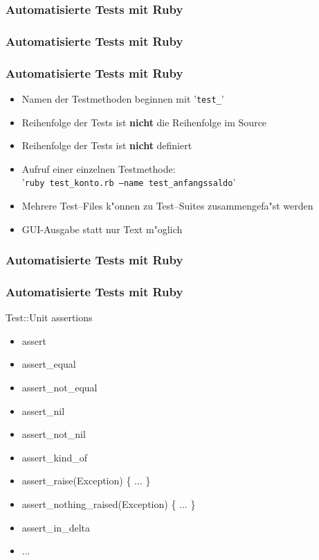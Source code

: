 \documentclass{beamer}
\begin{document}
\begin{frame}[containsverbatim]
  \frametitle{Automatisierte Tests mit Ruby}

\end{frame}

\begin{frame}[containsverbatim]
  \frametitle{Automatisierte Tests mit Ruby}

\end{frame}

\begin{frame}
  \frametitle{Automatisierte Tests mit Ruby}
  \begin{itemize}
    \item Namen der Testmethoden beginnen mit '\texttt{test\_}'
    \item Reihenfolge der Tests ist {\bf nicht} die Reihenfolge im Source
    \item Reihenfolge der Tests ist {\bf nicht} definiert
    \item Aufruf einer einzelnen Testmethode:\\ '\texttt{ruby test\_konto.rb --name test\_anfangssaldo}'
    \item Mehrere Test--Files k"onnen zu Test--Suites zusammengefa"st werden
    \item GUI-Ausgabe statt nur Text m"oglich
  \end{itemize}
\end{frame}

\begin{frame}[containsverbatim]
  \frametitle{Automatisierte Tests mit Ruby}
  
\end{frame}

\begin{frame}
  \frametitle{Automatisierte Tests mit Ruby}
  Test::Unit assertions
  \begin{itemize}
    \item assert
    \item assert\_equal
    \item assert\_not\_equal
    \item assert\_nil
    \item assert\_not\_nil
    \item assert\_kind\_of
    \item assert\_raise(Exception) \{ ... \}
    \item assert\_nothing\_raised(Exception) \{ ... \}
    \item assert\_in\_delta
    \item ...
  \end{itemize}
\end{frame}
\end{document}
